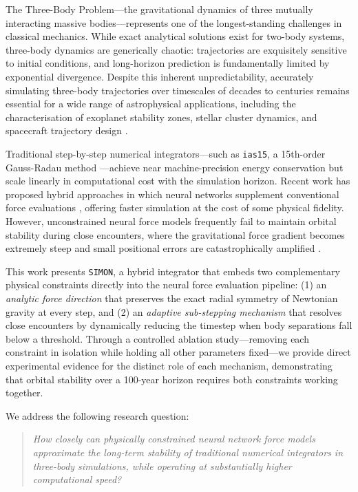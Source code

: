 \documentclass[12pt]{article}
\begin{document}
The Three-Body Problem---the gravitational dynamics of three mutually interacting
massive bodies---represents one of the longest-standing challenges in classical
mechanics. While exact analytical solutions exist for two-body systems, three-body
dynamics are generically chaotic: trajectories are exquisitely sensitive to initial
conditions, and long-horizon prediction is fundamentally limited by exponential
divergence. Despite this inherent unpredictability, accurately simulating three-body
trajectories over timescales of decades to centuries remains essential for a wide
range of astrophysical applications, including the characterisation of exoplanet
stability zones, stellar cluster dynamics, and spacecraft trajectory design
\citep{gardner2006james}.

Traditional step-by-step numerical integrators---such as \texttt{ias15}, a 15th-order
Gauss-Radau method \citep{Rein_2014}---achieve near machine-precision energy conservation
but scale linearly in computational cost with the simulation horizon. Recent work has
proposed hybrid approaches in which neural networks supplement conventional force
evaluations \citep{ulibarrena2024hybrid}, offering faster simulation at the cost of
some physical fidelity. However, unconstrained neural force models frequently fail to
maintain orbital stability during close encounters, where the gravitational force
gradient becomes extremely steep and small positional errors are catastrophically
amplified \citep{Dehnen2001}.

This work presents \texttt{SIMON}, a hybrid integrator that embeds two complementary
physical constraints directly into the neural force evaluation pipeline: (1) an
\emph{analytic force direction} that preserves the exact radial symmetry of Newtonian
gravity at every step, and (2) an \emph{adaptive sub-stepping mechanism} that resolves
close encounters by dynamically reducing the timestep when body separations fall below
a threshold. Through a controlled ablation study---removing each constraint in
isolation while holding all other parameters fixed---we provide direct experimental
evidence for the distinct role of each mechanism, demonstrating that orbital stability
over a 100-year horizon requires both constraints working together.

We address the following research question:

\begin{quote}
\emph{How closely can physically constrained neural network force models approximate
the long-term stability of traditional numerical integrators in three-body simulations,
while operating at substantially higher computational speed?}
\end{quote}
\end{document}
